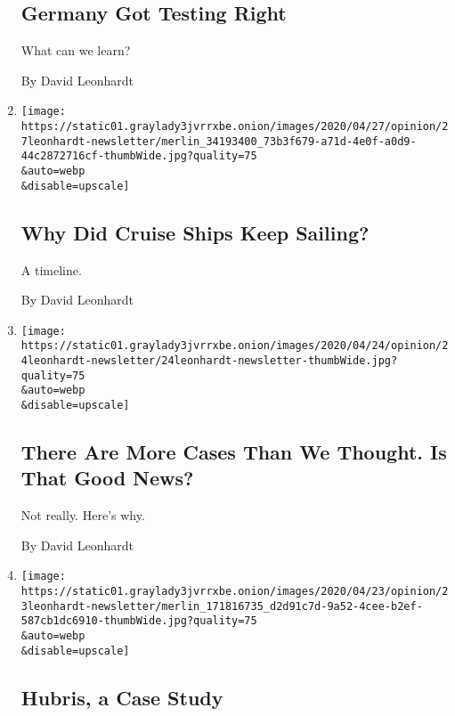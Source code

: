 \begin{enumerate}
  \hypertarget{germany-got-testing-right}{%
  \subsection{Germany Got Testing
  Right}\label{germany-got-testing-right}}

  What can we learn?

  By David Leonhardt
\item
  \href{/2020/04/27/opinion/coronavirus-cruise-celebrity-eclipse.html}{}

  \texttt{[image: https://static01.graylady3jvrrxbe.onion/images/2020/04/27/opinion/27leonhardt-newsletter/merlin\_34193400\_73b3f679-a71d-4e0f-a0d9-44c2872716cf-thumbWide.jpg?quality=75\\\&auto=webp\\\&disable=upscale]}

  \hypertarget{why-did-cruise-ships-keep-sailing}{%
  \subsection{Why Did Cruise Ships Keep
  Sailing?}\label{why-did-cruise-ships-keep-sailing}}

  A timeline.

  By David Leonhardt
\item
  \href{/2020/04/24/opinion/coronavirus-antibodies-test.html}{}

  \texttt{[image: https://static01.graylady3jvrrxbe.onion/images/2020/04/24/opinion/24leonhardt-newsletter/24leonhardt-newsletter-thumbWide.jpg?quality=75\\\&auto=webp\\\&disable=upscale]}

  \hypertarget{there-are-more-cases-than-we-thought-is-that-good-news}{%
  \subsection{There Are More Cases Than We Thought. Is That Good
  News?}\label{there-are-more-cases-than-we-thought-is-that-good-news}}

  Not really. Here's why.

  By David Leonhardt
\item
  \href{/2020/04/23/opinion/nfl-draft.html}{}

  \texttt{[image: https://static01.graylady3jvrrxbe.onion/images/2020/04/23/opinion/23leonhardt-newsletter/merlin\_171816735\_d2d91c7d-9a52-4cee-b2ef-587cb1dc6910-thumbWide.jpg?quality=75\\\&auto=webp\\\&disable=upscale]}

  \hypertarget{hubris-a-case-study}{%
  \subsection{Hubris, a Case Study}\label{hubris-a-case-study}}


\end{enumerate}
